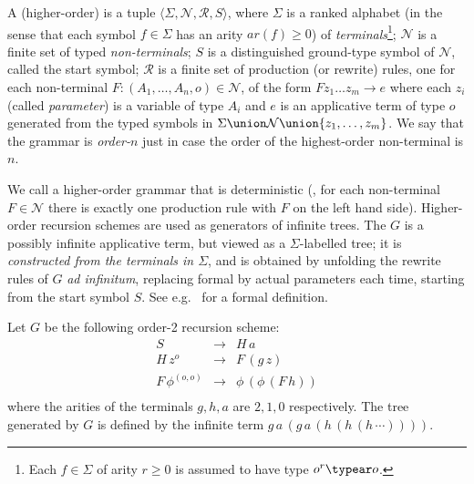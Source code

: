 A (higher-order)  is a tuple $\langle
\Sigma, \mathcal{N}, \mathcal{R}, S \rangle$, where $\Sigma$ is a
ranked alphabet (in the sense that each symbol $f \in \Sigma$ has an
arity $\mathit{ar}(f) \geq 0$) of \emph{terminals}\footnote{Each $f \in
  \Sigma$ of arity $r \geq 0$ is assumed to have type $o^r\typear o$.}; $\mathcal{N}$ is a finite set of typed
\emph{non-terminals}; $S$ is a distinguished ground-type symbol of
$\mathcal{N}$, called the start symbol; $\mathcal{R}$ is a finite set
of production (or rewrite) rules, one for each non-terminal $F : (A_1,
\ldots, A_n, o) \in \mathcal{N}$, of the form $ F z_1 \ldots z_m
\rightarrow e$ where each $z_i$ (called \emph{parameter}) is a
variable of type $A_i$ and $e$ is an applicative term of type $o$
generated from the typed symbols in $\Sigma \union \mathcal{N} \union \{z_1,
\ldots, z_m \}$. We say that the grammar is \emph{order-$n$} just in
case the order of the highest-order non-terminal is $n$.

We call  a higher-order
grammar that is deterministic (\ie, for each non-terminal $F \in
\mathcal{N}$ there is exactly one production rule with $F$ on the
left hand side). Higher-order recursion schemes are used as
generators of infinite trees. The  $G$ is a possibly infinite applicative term, but
viewed as a $\Sigma$-labelled tree; it is \emph{constructed from the
terminals in $\Sigma$}, and is obtained by unfolding the rewrite
rules of $G$ \emph{ad infinitum}, replacing formal by actual
parameters each time, starting from the start symbol $S$. See
e.g.~\cite{KNU02} for a formal definition.

\pssetcomptree
{}
\begin{example}\rm\label{eg:running}
  Let $G$ be the following order-2 recursion scheme:
\[\begin{array}{rll}
  S & \rightarrow & H \, a\\
  H \, z^o & \rightarrow & F \, (g \,
  z)\\
  F \, \phi^{(o, o)} & \rightarrow & \phi \, (\phi \, (F \, h))\\
\end{array}\]
where the arities of the terminals $g, h, a$ are $2, 1, 0$ respectively.
The tree generated by $G$ is defined by the infinite term $g \, a \, (g \, a \, (h \, (h \, (h \,
\cdots))))$.%

\end{example}

